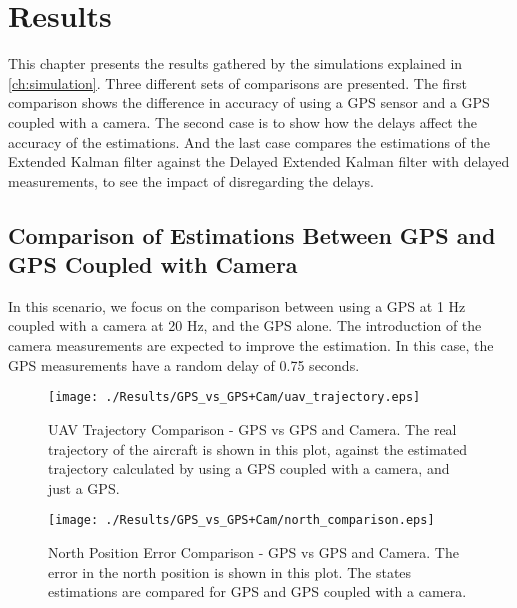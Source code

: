 \chapter{Results}
\label{ch:results}

This chapter presents the results gathered by the simulations explained in \ref{ch:simulation}. Three different sets of comparisons are presented. The first comparison shows the difference in accuracy of using a GPS sensor and a GPS coupled with a camera. The second case is to show how the delays affect the accuracy of the estimations. And the last case compares the estimations of the Extended Kalman filter against the Delayed Extended Kalman filter with delayed measurements, to see the impact of disregarding the delays.

\section{Comparison of Estimations Between GPS and GPS Coupled with Camera}
In this scenario, we focus on the comparison between using a GPS at 1 Hz coupled with a camera at 20 Hz, and the GPS alone. The introduction of the camera measurements are expected to improve the estimation. In this case, the GPS measurements have a random delay of 0.75 seconds.
\begin{figure}[H]
  \centering
  \texttt{[image: ./Results/GPS\_vs\_GPS+Cam/uav\_trajectory.eps]}
  \caption[UAV Trajectory Comparison - GPS vs GPS and Camera]{UAV Trajectory Comparison - GPS vs GPS and Camera. The real trajectory of the aircraft is shown in this plot, against the estimated trajectory calculated by using a GPS coupled with a camera, and just a GPS.}
\end{figure}

\begin{figure}[H]
  \centering
  \texttt{[image: ./Results/GPS\_vs\_GPS+Cam/north\_comparison.eps]}
  \caption[North Position Error Comparison - GPS vs GPS and Camera]{North Position Error Comparison - GPS vs GPS and Camera. The error in the north position is shown in this plot. The states estimations are compared for GPS and GPS coupled with a camera.}
\end{figure}


